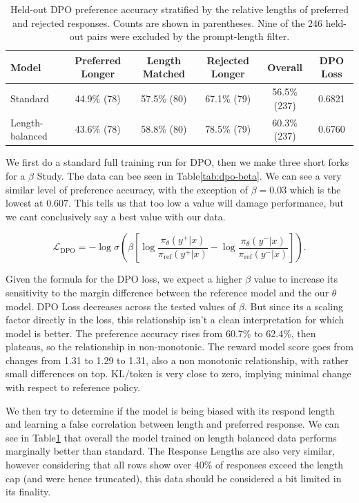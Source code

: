 \documentclass{article}
\begin{document}
\begin{table}[t]
    \centering
    \small
    \setlength{\tabcolsep}{5pt}
    \begin{tabular}{l c c c c c}
        \toprule
        Model & Preferred Longer & Length Matched &
        Rejected Longer & Overall & DPO Loss \\
        \midrule
        Standard
        & 44.9\% (78) & 57.5\% (80) & 67.1\% (79)
        & 56.5\% (237) & 0.6821 \\

        Length-balanced
        & 43.6\% (78) & 58.8\% (80) & 78.5\% (79)
        & 60.3\% (237) & 0.6760 \\
        \bottomrule
    \end{tabular}
    \caption{Held-out DPO preference accuracy stratified by the relative
    lengths of preferred and rejected responses. Counts are shown in
    parentheses. Nine of the 246 held-out pairs were excluded by the
    prompt-length filter.}
    \label{tab:dpo-length-strata}
\end{table}



We first do a standard full training run for DPO, then we make three short forks for a $\beta$ Study. The data can bee seen in Table\ref{tab:dpo-beta}. We can see
a very similar level of preference accuracy, with the exception of $\beta = 0.03$ which is the lowest at 0.607. This tells us that too low a value will damage performance,
but we cant conclusively say a best value with our data.

\[
\mathcal{L}_{\mathrm{DPO}} =
-\log \sigma\left(\beta\left[
\log\frac{\pi_\theta(y^{+}|x)}{\pi_{\mathrm{ref}}(y^{+}|x)}
-\log\frac{\pi_\theta(y^{-}|x)}{\pi_{\mathrm{ref}}(y^{-}|x)}
\right]\right).
\]

Given the formula for the DPO loss, we expect a higher $\beta$ value to increase its sensitivity to the margin difference between the reference model and the our $\theta$ model.
DPO Loss decreases across the tested values of \(\beta\). But since its a scaling factor directly in the loss, this relationship isn't a clean interpretation for which model is better.
The preference accuracy rises from 60.7\% to 62.4\%, then plateaus, so the relationship in non-monotonic. The reward model score goes from changes from 1.31 to 1.29 to 1.31, also a non monotonic
relationship, with rather small differences on top. KL/token is very close to zero, implying minimal change with respect to reference policy.

We then try to determine if the model is being biased with its respond length and learning a false correlation between length and preferred response. We can see in Table\ref{tab:dpo-length-strata}
that overall the model trained on length balanced data performs marginally better than standard.
The Response Lengths are also very similar, however considering that all rows show over 40\% of responses exceed
the length cap (and were hence truncated), this data should be considered a bit limited in its finality.
\end{document}

